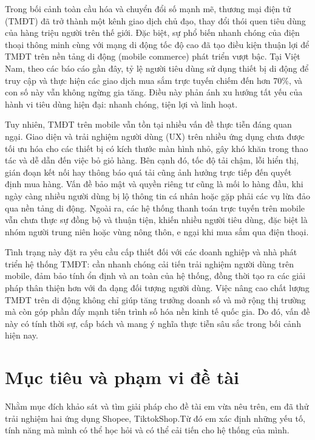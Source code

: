 \documentclass[../DoAn.tex]{subfiles}
\begin{document}
Trong bối cảnh toàn cầu hóa và chuyển đổi số mạnh mẽ, thương mại điện tử (TMĐT) đã trở thành một kênh giao dịch chủ đạo, thay đổi thói quen tiêu dùng của hàng triệu người trên thế giới. Đặc biệt, sự phổ biến nhanh chóng của điện thoại thông minh cùng với mạng di động tốc độ cao đã tạo điều kiện thuận lợi để TMĐT trên nền tảng di động (mobile commerce) phát triển vượt bậc. Tại Việt Nam, theo các báo cáo gần đây, tỷ lệ người tiêu dùng sử dụng thiết bị di động để truy cập và thực hiện các giao dịch mua sắm trực tuyến chiếm đến hơn 70\%, và con số này vẫn không ngừng gia tăng. Điều này phản ánh xu hướng tất yếu của hành vi tiêu dùng hiện đại: nhanh chóng, tiện lợi và linh hoạt.

Tuy nhiên, TMĐT trên mobile vẫn tồn tại nhiều vấn đề thực tiễn đáng quan ngại. Giao diện và trải nghiệm người dùng (UX) trên nhiều ứng dụng chưa được tối ưu hóa cho các thiết bị có kích thước màn hình nhỏ, gây khó khăn trong thao tác và dễ dẫn đến việc bỏ giỏ hàng. Bên cạnh đó, tốc độ tải chậm, lỗi hiển thị, gián đoạn kết nối hay thông báo quá tải cũng ảnh hưởng trực tiếp đến quyết định mua hàng. Vấn đề bảo mật và quyền riêng tư cũng là mối lo hàng đầu, khi ngày càng nhiều người dùng bị lộ thông tin cá nhân hoặc gặp phải các vụ lừa đảo qua nền tảng di động. Ngoài ra, các hệ thống thanh toán trực tuyến trên mobile vẫn chưa thực sự đồng bộ và thuận tiện, khiến nhiều người tiêu dùng, đặc biệt là nhóm người trung niên hoặc vùng nông thôn, e ngại khi mua sắm qua điện thoại.

Tình trạng này đặt ra yêu cầu cấp thiết đối với các doanh nghiệp và nhà phát triển hệ thống TMĐT: cần nhanh chóng cải tiến trải nghiệm người dùng trên mobile, đảm bảo tính ổn định và an toàn của hệ thống, đồng thời tạo ra các giải pháp thân thiện hơn với đa dạng đối tượng người dùng. Việc nâng cao chất lượng TMĐT trên di động không chỉ giúp tăng trưởng doanh số và mở rộng thị trường mà còn góp phần đẩy mạnh tiến trình số hóa nền kinh tế quốc gia. Do đó, vấn đề này có tính thời sự, cấp bách và mang ý nghĩa thực tiễn sâu sắc trong bối cảnh hiện nay.


\section{Mục tiêu và phạm vi đề tài}
\label{section:1.2}
Nhằm mục đích khảo sát và tìm giải pháp cho đề tài em vừa nêu trên, em đã thử trải nghiệm hai ứng dụng Shopee, TiktokShop.Từ đó em xác định những yếu tố, tính năng mà mình có thể học hỏi và có thể cải tiến cho hệ thống của mình.
\end{document}
